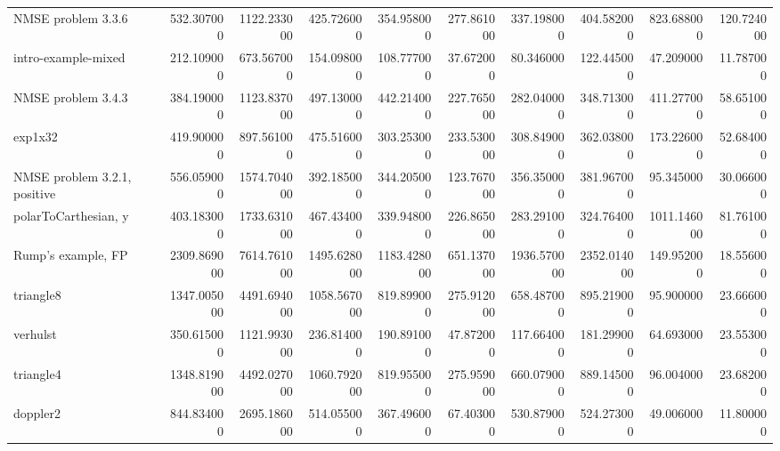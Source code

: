 \begin{longtable}{lrrrrrrrrr}
NMSE problem 3.3.6 & 532.307000 & 1122.233000 & 425.726000 & 354.958000 & 277.861000 & 337.198000 & 404.582000 & 823.688000 & 120.724000 \\
intro-example-mixed & 212.109000 & 673.567000 & 154.098000 & 108.777000 & 37.672000 & 80.346000 & 122.445000 & 47.209000 & 11.787000 \\
NMSE problem 3.4.3 & 384.190000 & 1123.837000 & 497.130000 & 442.214000 & 227.765000 & 282.040000 & 348.713000 & 411.277000 & 58.651000 \\
exp1x32 & 419.900000 & 897.561000 & 475.516000 & 303.253000 & 233.530000 & 308.849000 & 362.038000 & 173.226000 & 52.684000 \\
NMSE problem 3.2.1, positive & 556.059000 & 1574.704000 & 392.185000 & 344.205000 & 123.767000 & 356.350000 & 381.967000 & 95.345000 & 30.066000 \\
polarToCarthesian, y & 403.183000 & 1733.631000 & 467.434000 & 339.948000 & 226.865000 & 283.291000 & 324.764000 & 1011.146000 & 81.761000 \\
Rump's example, FP & 2309.869000 & 7614.761000 & 1495.628000 & 1183.428000 & 651.137000 & 1936.570000 & 2352.014000 & 149.952000 & 18.556000 \\
triangle8 & 1347.005000 & 4491.694000 & 1058.567000 & 819.899000 & 275.912000 & 658.487000 & 895.219000 & 95.900000 & 23.666000 \\
verhulst & 350.615000 & 1121.993000 & 236.814000 & 190.891000 & 47.872000 & 117.664000 & 181.299000 & 64.693000 & 23.553000 \\
triangle4 & 1348.819000 & 4492.027000 & 1060.792000 & 819.955000 & 275.959000 & 660.079000 & 889.145000 & 96.004000 & 23.682000 \\
doppler2 & 844.834000 & 2695.186000 & 514.055000 & 367.496000 & 67.403000 & 530.879000 & 524.273000 & 49.006000 & 11.800000 \\
\hline
\end{longtable}

\endgroup
\clearpage
\twocolumn
